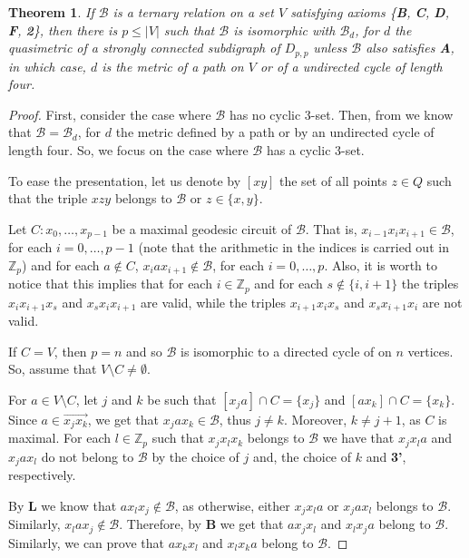 \documentclass{article}
\newtheorem{theorem}[definition]{Theorem}
\newcommand{\Z}{\mathbb{Z}}
\newcommand{\calb}{\mathcal{B}}
\begin{document}
\begin{theorem}
\label{t:type1iffD}
    If $\calb$ is a ternary relation on a set $V$ satisfying axioms \{\textbf{B}, \textbf{C}, \textbf{D}, \textbf{F}, \textbf{2}\}, then there is $p\leq |V|$ such that $\calb$ is isomorphic with $\calb_d$, for $d$ the quasimetric of a strongly connected subdigraph of $D_{p,p}$ unless $\calb$ also satisfies \textbf{A}, in which case, $d$ is the metric of a path on $V$ or of a undirected cycle of length four.
\end{theorem}


\begin{proof}
	First, consider the case where $\calb$ has no cyclic 3-set. Then, from \cite{shepperd1956transitivities} we know that $\calb=\calb_d$, for $d$ the metric defined by a path or by an undirected cycle of length four. So, we focus on the case where $\calb$ has a cyclic 3-set. 
	
	To ease the presentation, let us denote by $[xy]$ the set of all points $z\in Q$ such that the triple $xzy$ belongs to $\calb$ or $z\in \{x,y\}$.
	
	
	Let $C: x_0,\ldots,x_{p-1}$ be a maximal geodesic circuit of $\calb$. That is,  $x_{i-1}x_ix_{i+1}\in \calb$, for each $i=0,\ldots,p-1$ (note that the arithmetic in the indices is carried out in $\Z_{p}$) and for each $a \notin C$, $x_iax_{i+1}\notin \calb$, for each  $i=0,\ldots,p$. Also, it is worth to notice that this implies that for each $i\in \Z_p$ and for each $s\notin \{i,i+1\}$ the triples $x_{i}x_{i+1}x_s$ and $x_sx_ix_{i+1}$ are valid, while the triples $x_{i+1}x_{i}x_s$ and $x_sx_{i+1}x_{i}$ are not valid.
	
	If $C = V$, then $p = n$ and so $\calb$ is isomorphic to a directed cycle of on $n$ vertices. So, assume that $V \setminus C \neq \emptyset$.
	
	For $a \in V \setminus C$, let $j$ and $k$ be such that $[x_j a] \cap C = \{ x_j \}$ and $[ a x_k ] \cap C = \{x_k\}$. Since  $a \in \overrightarrow{x_j x_k}$, we get that $x_j a x_k\in \calb$, thus $j\neq k$. Moreover, $k\neq j+1$, as $C$ is maximal. 
    For each $l\in \Z_p$ such that $x_jx_lx_k$ belongs to $\calb$ we have that $x_jx_la$ and $x_jax_l$ do not belong to $\calb$ by the choice of $j$ and, the choice of $k$ and \textbf{3'}, respectively.

    By \textbf{L} we know that $ax_lx_j\notin \calb$, as otherwise, either $x_jx_la$ or $x_jax_l$ belongs to $\calb$. Similarly, $x_lax_j\notin \calb$. Therefore, by \textbf{B} we get that $ax_jx_l$ and $x_lx_ja$ belong to $\calb$. Similarly, we can prove that $ax_kx_l$ and $x_lx_ka$ belong to $\calb$.


\end{proof}
\end{document}
